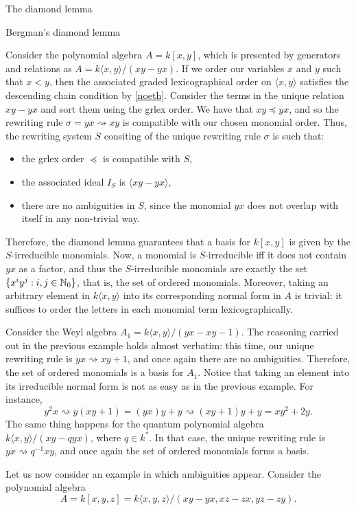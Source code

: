 \begin{chapter}{The diamond lemma}
\begin{section}{Bergman's diamond lemma}
\begin{exmp} Consider the polynomial algebra $A=k[x,y]$, which is presented by generators and relations as $A=k\langle x,y\rangle/(xy-yx)$. If we order our variables $x$ and $y$ such that $x<y$, then the associated graded lexicographical order on $\langle x,y\rangle$ satisfies the descending chain condition by \ref{noeth}. Consider the terms in the unique relation $xy-yx$ and sort them using the grlex order. We have that $xy\preceq yx$, and so the rewriting rule $\sigma=yx\rightsquigarrow xy$ is compatible with our chosen monomial order. Thus, the rewriting system $S$ consiting of the unique rewriting rule $\sigma$ is such that:
\begin{itemize}
\item the grlex order $\preceq$ is compatible with $S$,
\item the associated ideal $I_S$ is $\langle xy-yx\rangle$,
\item there are no ambiguities in $S$, since the monomial $yx$ does not overlap with itself in any non-trivial way.
\end{itemize}
Therefore, the diamond lemma guarantees that a basis for $k[x,y]$ is given by the $S$-irreducible monomials. Now, a monomial is $S$-irreducible iff it does not contain $yx$ as a factor, and thus the $S$-irreducible monomials are exactly the set $\{x^iy^j:i,j\in\mathbb{N}_0\}$, that is, the set of ordered monomials.
Moreover, taking an arbitrary element in $k\langle x,y\rangle$ into its corresponding normal form in $A$ is trivial: it suffices to order the letters in each monomial term lexicographically.
\end{exmp}
\begin{exmp} Consider the Weyl algebra $A_1 = k\langle x,y\rangle/(yx-xy-1)$. The reasoning carried out in the previous example holds almost verbatim: this time, our unique rewriting rule is $yx\rightsquigarrow xy + 1$, and once again there are no ambiguities. Therefore, the set of ordered monomials is a basis for $A_1$. Notice that taking an element into its irreducible normal form is not as easy as in the previous example. For instance, 
\[y^2x\rightsquigarrow y(xy+1) = (yx)y +y \rightsquigarrow (xy+1)y + y =xy^2 +2y.\]
The same thing happens for the quantum polynomial algebra $k\langle x,y\rangle/(xy-qyx)$, where $q\in k^*$. In that case, the unique rewriting rule is $yx\rightsquigarrow q^{-1}xy$, and once again the set of ordered monomials forms a basis.
\end{exmp}
\begin{exmp} Let us now consider an example in which ambiguities appear. Consider the polynomial algebra \[A=k[x,y,z]=k\langle x,y,z\rangle/(xy-yx, xz-zx, yz-zy).\]

\end{exmp}
\end{section}
\end{chapter}
